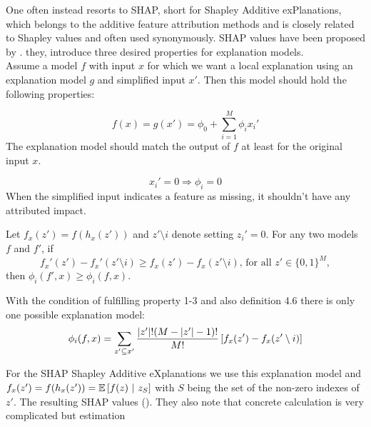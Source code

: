 One often instead resorts to SHAP, short for Shapley Additive exPlanations, which belongs to the additive feature attribution methods and is closely related to Shapley values and often used synonymously.
SHAP values have been proposed by \cite{lundberg-2017}.
they, introduce three desired properties for explanation models.\\
Assume a model $f$ with input $x$ for which we want a local explanation using an explanation model $g$ and simplified input $x'$. Then this model should hold the following properties: 
\begin{property}
    $$f(x)=g(x')=\phi_0+\sum_{i=1}^M\phi_i x_i'$$
    The explanation model should match the output of $f$ at least for the original input $x$.
\end{property}
\begin{property}[Missingness] 
    $$x_i'=0\Longrightarrow\phi_i=0$$
    When the simplified input indicates a feature as missing, it shouldn't have any attributed impact.
\end{property}
\begin{property}[Consistency]
    Let $f_x(z') = f(h_x(z'))$ and $z'\setminus i$ denote setting $z_i'=0$. For any two models $f$ and $f'$, if
    $$ f_x'(z')-f_x'(z'\setminus i)\geq f_x(z')-f_x(z'\setminus i)\textrm{, for all } z'\in\{0,1\}^M,$$
    then $\phi_i(f',x) \geq \phi_i(f,x)$.
\end{property}
\begin{theorem}
    With the condition of fulfilling property 1-3 and also definition 4.6 there is only one possible explanation model:
    \begin{align}
        \phi_i(f,x)= \sum_{z'\subseteq x'} \frac{\left\lvert z' \right\lvert!(M-\left\lvert z' \right\lvert-1)!}{M!} \left[ f_x(z') -f_x(z'\setminus i)\right]
    \end{align}
\end{theorem}
For the SHAP Shapley Additive eXplanations we use this explanation model and $f_x(z') = f(h_x(z')) = \mathbb{E} \left[ f(z)\ \vert\ z_S \right]$ with $S$ being the set of the non-zero indexes of $z'$.
The resulting SHAP values (\cite{lundberg-2017}).
They also note that concrete calculation is very complicated \color{red} but estimation \color{black}
